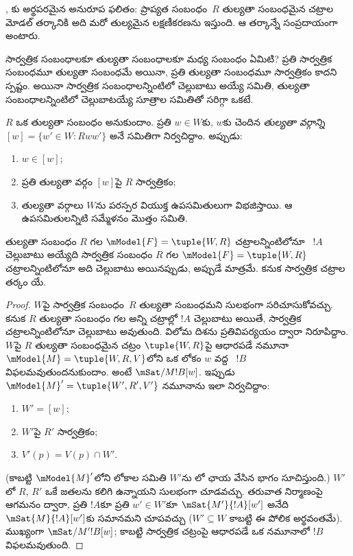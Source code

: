 \documentclass[../../../include/open-logic-section]{subfiles}
\begin{document}
,
కు అర్థపరమైన అనురూప ఫలితం:
ప్రాప్యత సంబంధం~$R$ తుల్యతా సంబంధమైన చట్రాల మోడల్
తర్కానికి అది మరో తుల్యమైన లక్షణీకరణను ఇస్తుంది.
ఆ తర్కాన్నే సంప్రదాయంగా  అంటారు.

సార్వత్రిక సంబంధాలకూ తుల్యతా సంబంధాలకూ మధ్య సంబంధం ఏమిటి?
ప్రతి సార్వత్రిక సంబంధమూ తుల్యతా సంబంధమే అయినా,
ప్రతి తుల్యతా సంబంధమూ సార్వత్రికం కాదని స్పష్టం.
అయినా సార్వత్రిక సంబంధాలన్నింటిలో చెల్లుబాటు అయ్యే
 సమితి, తుల్యతా
సంబంధాలన్నింటిలో చెల్లుబాటయ్యే సూత్రాల
సమితితో సరిగ్గా ఒకటే.

\begin{prop}
  $R$ ఒక తుల్యతా సంబంధం అనుకుందాం. ప్రతి $w \in W$కు,
  $w$కు చెందిన \emph{తుల్యతా వర్గాన్ని} $[w] = \{w'\in W :
  Rww'\}$ అనే సమితిగా నిర్వచిద్దాం. అప్పుడు:
  \begin{enumerate}
  \item $w \in [w]$;
  \item ప్రతి తుల్యతా వర్గం $[w]$పై $R$ సార్వత్రికం;
  \item తుల్యతా వర్గాలు $W$ను పరస్పర వియుక్త ఉపసమితులుగా
    విభజిస్తాయి. ఆ ఉపసమితులన్నిటి సమ్మేళనం మొత్తం సమితి.
  \end{enumerate}
\end{prop}

\begin{prop}
  తుల్యతా సంబంధం $R$ గల
  $\mModel{F} =\tuple{W,R}$ చట్రాలన్నింటిలోనూ
  ~$!A$ చెల్లుబాటు
  అయ్యేది సార్వత్రిక సంబంధం $R$ గల
  $\mModel{F} =\tuple{W,R}$ చట్రాలన్నింటిలోనూ అది చెల్లుబాటు
  అయినప్పుడు, అప్పుడే మాత్రమే. కనుక సార్వత్రిక చట్రాల
  తర్కం యే.
\end{prop}

\begin{proof}
  $W$పై సార్వత్రిక సంబంధం~$R$ తుల్యతా సంబంధమని
  సులభంగా సరిచూసుకోవచ్చు. కనుక $R$ తుల్యతా సంబంధం గల
  అన్ని చట్రాల్లో $!A$ చెల్లుబాటు అయితే,
  సార్వత్రిక చట్రాలన్నింటిలోనూ చెల్లుబాటు అవుతుంది.
  విలోమ దిశను ప్రతివిపర్యయం ద్వారా నిరూపిద్దాం.
  $W$పై $R$ తుల్యతా సంబంధమైన చట్రం
  $\tuple{W,R}$పై ఆధారపడే నమూనా
  $\mModel{M} = \tuple{W, R, V}$లోని ఒక లోకం $w$
  వద్ద ~$!B$
  విఫలమవుతుందనుకుందాం. అంటే $\mSat/{M}{!B}[w]$.
  ఇప్పుడు $\mModel{M}' = \tuple{W', R', V'}$ నమూనాను
  ఇలా నిర్వచిద్దాం:
  \begin{enumerate}
  \item $W' = [w]$;
  \item $W'$పై $R'$ సార్వత్రికం;
  \item $V'(p) = V(p) \cap W'$.
  \end{enumerate}
  (కాబట్టి $\mModel{M}'$లోని లోకాల సమితి $W'$ను
  లో ఛాయ వేసిన భాగం సూచిస్తుంది.)
  $W'$లో $R$, $R'$ ఒకే జతలను కలిగి ఉన్నాయని సులభంగా చూడవచ్చు.
  తరువాత  నిర్మాణంపై ఆగమనం ద్వారా,
  ప్రతి $!A$కూ ప్రతి $w' \in W'$కూ
  $\mSat{M'}{!A}[w']$ అనేది
  $\mSat{M}{!A}[w']$కు సమానమని చూపవచ్చు ($W'
  \subseteq W$ కాబట్టి ఈ పోలిక అర్థవంతమే).
  ముఖ్యంగా $\mSat/{M'}{!B}[w]$; కాబట్టి
  సార్వత్రిక చట్రంపై ఆధారపడే ఒక నమూనాలో $!B$
  విఫలమవుతుంది.
\end{proof}
\end{document}
